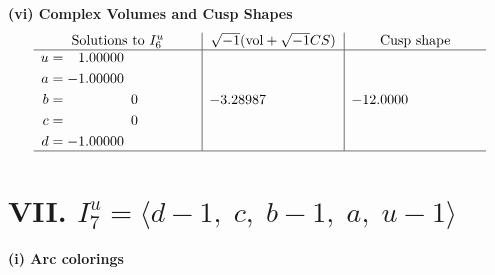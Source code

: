 \documentclass[1p]{elsarticle_modified}
\theoremstyle{definition}
\newcommand{\I}{\sqrt{-1}}
\begin{document}
\newpage\flushleft \textbf{(vi) Complex Volumes and Cusp Shapes}
$$\begin{array}{c|c|c}  
\text{Solutions to }I^u_{6}& \I (\text{vol} + \sqrt{-1}CS) & \text{Cusp shape}\\
 \hline 
\begin{aligned}
u &= \phantom{-}1.00000\phantom{ +0.000000I} \\
a &= -1.00000\phantom{ +0.000000I} \\
b &= \phantom{-0.000000 } 0 \\
c &= \phantom{-0.000000 } 0 \\
d &= -1.00000\phantom{ +0.000000I}\end{aligned}
 & -3.28987\phantom{ +0.000000I} & -12.0000\phantom{ +0.000000I}\\
 \hline 
 \end{array}$$\newpage\newpage\renewcommand{\arraystretch}{1}
\centering \section*{VII. $I^u_{7}= \langle d-1,\;c,\;b-1,\;a,\;u-1 \rangle$}
\flushleft \textbf{(i) Arc colorings}\\
\end{document}
